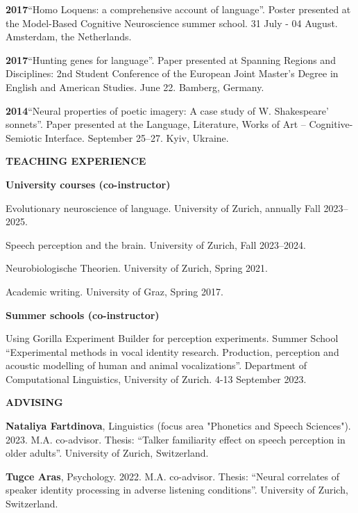 \documentclass[11pt]{article}
\newcommand{\hangpara}{
 \setlength{\parindent}{0in} %
 \hangindent=0.42in %
}
\begin{document}
\vskip 6pt
\hangpara
{\bf 2017}\hspace{1ex}“Homo Loquens: a comprehensive account of language”. Poster presented at the Model-Based Cognitive Neuroscience summer school. 31 July - 04 August. Amsterdam, the Netherlands.


\vskip 6pt
\hangpara
{\bf 2017}\hspace{1ex}“Hunting genes for language”. Paper presented at Spanning Regions and Disciplines: 2nd Student Conference of the European Joint Master's Degree in English and American Studies. June 22. Bamberg, Germany.


\vskip 6pt
\hangpara
{\bf 2014}\hspace{1ex}“Neural properties of poetic imagery: A case study of W. Shakespeare’ sonnets”. Paper presented at the Language, Literature, Works of Art – Cognitive-Semiotic Interface. September 25--27. Kyiv, Ukraine.





\vskip 20pt
\begin{flushleft}
{\bf TEACHING EXPERIENCE}
\end{flushleft}
\begin{flushleft}
{\bf University courses (co-instructor)}
\end{flushleft}
\hangpara Evolutionary neuroscience of language. University of Zurich, annually Fall 2023--2025.
\vskip 6pt
\hangpara Speech perception and the brain. University of Zurich, Fall 2023--2024.
\vskip 6pt
\hangpara Neurobiologische Theorien. University of Zurich, Spring 2021.
\hangpara Academic writing. University of Graz, Spring 2017.




\begin{flushleft}
{\bf Summer schools (co-instructor)}
\end{flushleft}
\hangpara Using Gorilla Experiment Builder for perception experiments. Summer School “Experimental methods in vocal identity research. Production, perception and acoustic modelling of human and animal vocalizations”. Department of Computational Linguistics, University of Zurich. 4-13 September 2023.




\vskip 20pt
\begin{flushleft}
{\bf ADVISING}
\end{flushleft}
\hangpara \textbf{Nataliya Fartdinova}, Linguistics (focus area "Phonetics and Speech Sciences"). 2023. M.A. co-advisor. Thesis: “Talker familiarity effect on speech perception in older adults”. University of Zurich, Switzerland.
\vskip 6pt
\hangpara \textbf{Tugce Aras}, Psychology. 2022. M.A. co-advisor. Thesis: “Neural correlates of speaker identity processing in adverse listening conditions”. University of Zurich, Switzerland.
\end{document}
